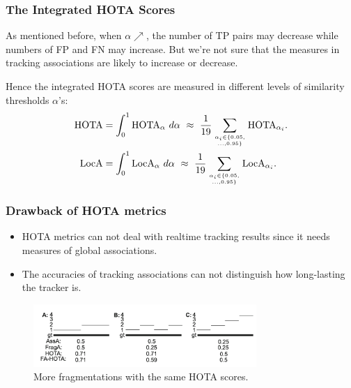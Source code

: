 \documentclass[slidetop, mathserif]{beamer}
\begin{document}
\begin{frame}
	\frametitle{The Integrated HOTA Scores}

	As mentioned before, when $\alpha\nearrow$,
	the number of TP pairs may decrease while numbers of FP and FN may increase.
	But we're not sure that
	the measures in tracking associations are likely to increase or decrease.

	\quad

	Hence the integrated HOTA scores are measured in different levels of
	similarity thresholds $\alpha$'s:
	\begin{align*}
		\text{HOTA} & = \int_0^1\text{HOTA}_\alpha\ d\alpha
		~ \approx ~ \dfrac1{19}\sum_{\alpha_i\in\{0.05,\atop \ldots,0.95\}}
		\text{HOTA}_{\alpha_i}. \\
		\text{LocA} & = \int_0^1\text{LocA}_\alpha\ d\alpha
		~ \approx ~ \dfrac1{19}\sum_{\alpha_i\in\{0.05,\atop \ldots,0.95\}}
		\text{LocA}_{\alpha_i}.
	\end{align*}
\end{frame}

\begin{frame}
	\frametitle{Drawback of HOTA metrics}
	
	\begin{itemize}
	\item HOTA metrics can not deal with realtime tracking results
		since it needs measures of global associations.
	\item The accuracies of tracking associations can not distinguish
		how long-lasting the tracker is.
	\end{itemize}

	\begin{figure}
		\includegraphics[width=240pt]{pics/tracking05.png}
		\caption{More fragmentations with the same HOTA scores.}
	\end{figure}

\end{frame}
\end{document}

